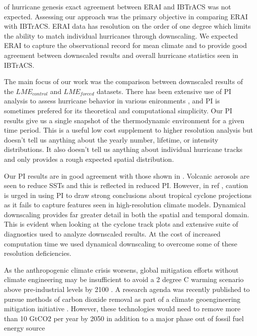 \documentclass[phd,tocprelim]{cornell}
\begin{document}
of hurricane genesis exact agreement between ERAI and IBTrACS was not expected. 
Assessing our approach was the primary objective in comparing ERAI with 
IBTrACS. ERAI data has resolution on the order of one degree which 
limits the ability to match individual hurricanes through downscaling. 
We expected ERAI to capture the observational record for mean climate 
and to provide good agreement between downscaled results and overall hurricane
statistics seen in IBTrACS.
\par
The main focus of our work was the comparison between downscaled results of the
$LME_{control}$ and $LME_{forced}$ datasets. There has been extensive use of 
PI analysis to assess hurricane behavior in various enironments 
\cite{yan2018divergent,ting2015,Kossin2009,vecchi2007effect}, and PI is sometimes 
prefered for its theoretical and computational simplicity. Our PI results give us a
single snapshot of the thermodynamic environment for a given time period. This
is a useful low cost supplement to higher resolution analysis but
doesn't tell us anything about the yearly number, lifetime, or intensity 
distributions. It also doesn't tell us anything about individual hurricane
tracks and only provides a rough expected spatial distribution. 
\par
Our PI results are in good agreement with those shown in \cite{yan2018divergent,vecchi2007effect}. Volcanic aerosols are seen to reduce SSTs and this is reflected
in reduced PI. However, in ref \cite{wehner2015}, caution is urged in using PI 
to draw strong conclusions about tropical cyclone projections as it fails to 
capture features seen in high-resolution climate models. Dynamical 
downscaling provides far greater detail in both the spatial and temporal domain. 
This is evident when looking at the cyclone track plots and extensive suite of 
diagnostics used to analyze downscaled results. At the cost of increased 
computation time we used dynamical downscaling to overcome some of these 
resolution deficiencies. 
\par
As the anthropogenic climate crisis worsens, global mitigation efforts 
without climate engineering may be insufficient to avoid a 2 degree C 
warming scenario above pre-industrial levels by 2100 
\cite{intergovernmental2018global}. A research agenda was recently 
published to pursue methods of carbon dioxide removal as part of a climate 
geoengineering mitigation initiative \cite{national2018negative}.  However, 
these technologies would need to remove more than 10 GtCO2 per year by 2050 
in addition to a major phase out of fossil fuel energy source 
\end{document}
